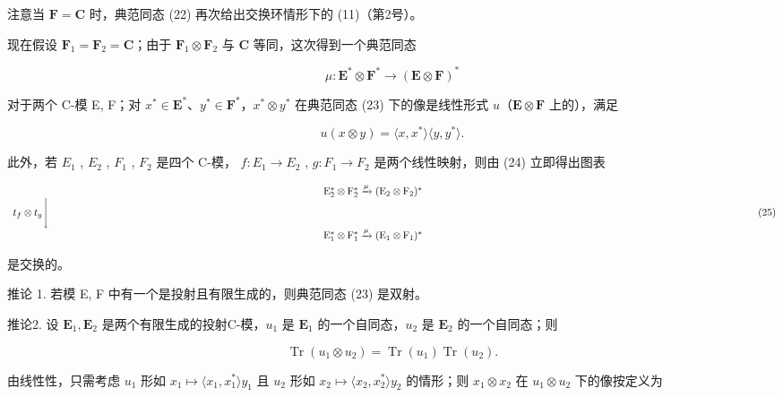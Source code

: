 注意当 \(\mathbf{F} = \mathbf{C}\) 时，典范同态 (22) 再次给出交换环情形下的 (11)（第2号）。

现在假设 \(\mathbf{F}_1 = \mathbf{F}_2 = \mathbf{C}\)；由于 \(\mathbf{F}_1 \otimes \mathbf{F}_2\) 与 \(\mathbf{C}\) 等同，这次得到一个典范同态

\[
\mu : \mathbf {E} ^ {*} \otimes \mathbf {F} ^ {*} \rightarrow (\mathbf {E} \otimes \mathbf {F}) ^ {*}\tag{23}
\]

对于两个 C-模 E, F；对 \(x^{*} \in \mathbf{E}^{*}\)、\(y^{*} \in \mathbf{F}^{*}\)，\(x^{*} \otimes y^{*}\) 在典范同态 (23) 下的像是线性形式 \(u\)（\(\mathbf{E} \otimes \mathbf{F}\) 上的），满足

\[
u (x \otimes y) = \langle x, x ^ {*} \rangle \langle y, y ^ {*} \rangle .\tag{24}
\]

此外，若 \(E_{1}\) , \(E_{2}\) , \(F_{1}\) , \(F_{2}\) 是四个 C-模， \(f: E_{1} \rightarrow E_{2}\) , \(g: F_{1} \rightarrow F_{2}\) 是两个线性映射，则由 (24) 立即得出图表

\[
\begin{array}{c} \mathrm{E} _ {2} ^ {*} \otimes \mathrm{F} _ {2} ^ {*} \xrightarrow {\mu} (\mathrm{E} _ {2} \otimes \mathrm{F} _ {2}) ^ {*} \\ t _ {f} \otimes t _ {g} \Biggl \downarrow \qquad \qquad \qquad \qquad \qquad \qquad \qquad \qquad \qquad \qquad \qquad \qquad \qquad \qquad \qquad \qquad \qquad \qquad \qquad \qquad \qquad \qquad \qquad \qquad \qquad \qquad \qquad \qquad \qquad \qquad \qquad \qquad \qquad \qquad \\ \mathrm{E} _ {1} ^ {*} \otimes \mathrm{F} _ {1} ^ {*} \xrightarrow {\mu} (\mathrm{E} _ {1} \otimes \mathrm{F} _ {1}) ^ {*} \end{array}\tag{25}
\]

是交换的。

推论 1. 若模 E, F 中有一个是投射且有限生成的，则典范同态 (23) 是双射。

推论2. 设 \(\mathbf{E}_1, \mathbf{E}_2\) 是两个有限生成的投射C-模，\(u_1\) 是 \(\mathbf{E}_1\) 的一个自同态，\(u_2\) 是 \(\mathbf{E}_2\) 的一个自同态；则

\[
\operatorname{Tr} (u _ {1} \otimes u _ {2}) = \operatorname{Tr} (u _ {1}) \operatorname{Tr} (u _ {2}).\tag{26}
\]

由线性性，只需考虑 \(u_{1}\) 形如 \(x_{1} \mapsto \langle x_{1}, x_{1}^{*} \rangle y_{1}\) 且 \(u_{2}\) 形如 \(x_{2} \mapsto \langle x_{2}, x_{2}^{*} \rangle y_{2}\) 的情形；则 \(x_{1} \otimes x_{2}\) 在 \(u_{1} \otimes u_{2}\) 下的像按定义为

